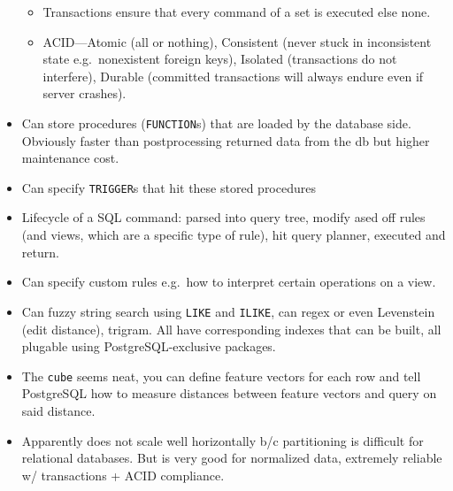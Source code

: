 \documentclass[10pt]{article}
\begin{document}
\begin{itemize}
\begin{itemize}
            \item Transactions ensure that every command of a set is executed
                else none.
            \item ACID---Atomic (all or nothing), Consistent (never stuck in
                inconsistent state e.g.\ nonexistent foreign keys), Isolated
                (transactions do not interfere), Durable (committed transactions
                will always endure even if server crashes).
        \end{itemize}
    \item Can store procedures (\lstinline{FUNCTION}s) that are loaded by the
        database side. Obviously faster than postprocessing returned data from
        the db but higher maintenance cost.
    \item Can specify \lstinline{TRIGGER}s that hit these stored procedures
    \item Lifecycle of a SQL command: parsed into query tree, modify ased off
        rules (and views, which are a specific type of rule), hit query planner,
        executed and return.
    \item Can specify custom rules e.g.\ how to interpret certain operations on
        a view.
    \item Can fuzzy string search using \lstinline{LIKE} and \lstinline{ILIKE},
        can regex or even Levenstein (edit distance), trigram. All have
        corresponding indexes that can be built, all plugable using
        PostgreSQL-exclusive packages.
    \item The \lstinline{cube} seems neat, you can define feature vectors for
        each row and tell PostgreSQL how to measure distances between feature
        vectors and query on said distance.
    \item Apparently does not scale well horizontally b/c partitioning is
        difficult for relational databases. But is very good for normalized
        data, extremely reliable w/ transactions + ACID compliance.
\end{itemize}
\end{document}

